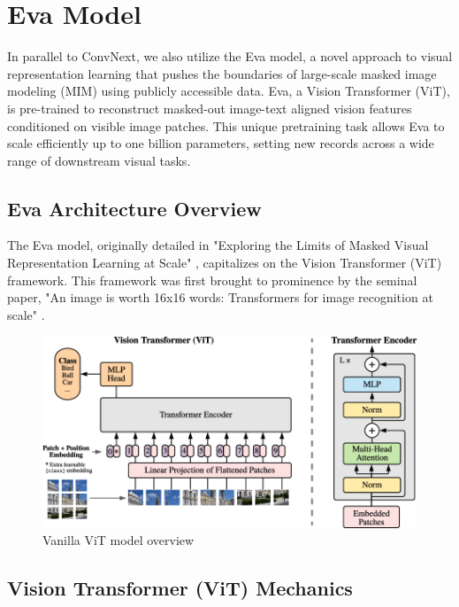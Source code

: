 \documentclass[a4paper,12pt,openright]{book}
\begin{document}
\section{Eva Model}
\label{sec:eva}

In parallel to ConvNext, we also utilize the Eva model, a novel approach to visual representation learning that pushes the boundaries of large-scale masked image modeling (MIM) using publicly accessible data. Eva, a Vision Transformer (ViT), is pre-trained to reconstruct masked-out image-text aligned vision features conditioned on visible image patches. This unique pretraining task allows Eva to scale efficiently up to one billion parameters, setting new records across a wide range of downstream visual tasks. 


\subsection{Eva Architecture Overview}
\label{subsec:eva_architecture}

The Eva model, originally detailed in "Exploring the Limits of Masked Visual Representation Learning at Scale" \cite{fang2022eva}, capitalizes on the Vision Transformer (ViT) framework. This framework was first brought to prominence by the seminal paper, "An image is worth 16x16 words: Transformers for image recognition at scale" \cite{DBLP:journals/corr/abs-2010-11929}.

\begin{figure}[h]
\centering
\includegraphics[width=1.1\textwidth]{images/eva_arhitecture.png}
\caption{Vanilla ViT model overview \cite{DBLP:journals/corr/abs-2010-11929}}\label{fig:eva}
\end{figure}


\subsection{Vision Transformer (ViT) Mechanics}
\label{subsec:vit_mechanics}
\end{document}
